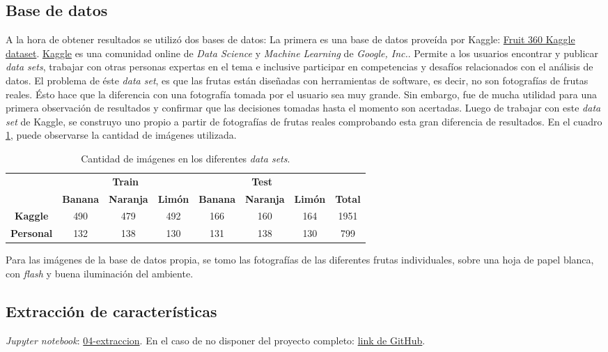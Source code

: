 \documentclass[10pt,a4paper]{article}
\begin{document}
\subsection{Base de datos}
A la hora de obtener resultados se utilizó dos bases de datos: La primera es una base de datos proveída por Kaggle: \href{https://www.kaggle.com/moltean/fruits}{Fruit 360 Kaggle dataset}. \href{https://www.kaggle.com}{Kaggle} es una comunidad online de \textit{Data Science} y \textit{Machine Learning} de \textit{Google, Inc.}. Permite a los usuarios encontrar y publicar \textit{data sets}, trabajar con otras personas expertas en el tema e inclusive participar en competencias y desafíos relacionados con el análisis de datos. El problema de éste \textit{data set}, es que las frutas están diseñadas con herramientas de software, es decir, no son fotografías de frutas reales. Ésto hace que la diferencia con una fotografía tomada por el usuario sea muy grande. Sin embargo, fue de mucha utilidad para una primera observación de resultados y confirmar que las decisiones tomadas hasta el momento son acertadas. Luego de trabajar con este \textit{data set} de Kaggle, se construyo uno propio a partir de fotografías de frutas reales comprobando esta gran diferencia de resultados. En el cuadro \ref{dataset}, puede observarse la cantidad de imágenes utilizada.

\begin{table}[h]
\centering
\begin{tabular}{|c|c|c|c|c|c|c|c|}
\hline
\multirow{2}{*}{\textbf{}} & \multicolumn{3}{c|}{\textbf{Train}} & \multicolumn{3}{c|}{\textbf{Test}} &  \\ \cline{2-8} 
 & \textbf{Banana} & \textbf{Naranja} & \textbf{Limón} & \textbf{Banana} & \textbf{Naranja} & \textbf{Limón} & \textbf{Total} \\ \hline
\textbf{Kaggle} & 490 & 479 & 492 & 166 & 160 & 164 & 1951 \\ \hline
\textbf{Personal} & 132 & 138 & 130 & 131 & 138 & 130 & 799 \\ \hline
\end{tabular}
\caption{Cantidad de imágenes en los diferentes \textit{data sets}.}
\label{dataset}
\end{table}

Para las imágenes de la base de datos propia, se tomo las fotografías de las diferentes frutas individuales, sobre una hoja de papel blanca, con \textit{flash} y buena iluminación del ambiente.

\subsection{Extracción de características}
\textit{Jupyter notebook}: \href{./04-extraccion.ipynb}{04-extraccion}. En el caso de no disponer del proyecto completo: \href{https://github.com/FernandezGFG/fruit-classifier/blob/master/04-extraccion.ipynb}{link de GitHub}.
\end{document}
